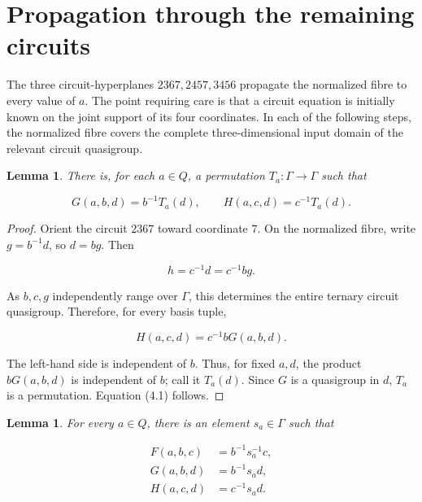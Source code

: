 \documentclass[11pt]{article}
\newtheorem{lemma}[theorem]{Lemma}
\numberwithin{equation}{section}
\begin{document}
\section{Propagation through the remaining circuits}


The three circuit-hyperplanes $2367,2457,3456$ propagate the normalized
fibre to every value of $a$. The point requiring care is that a circuit
equation is initially known on the joint support of its four coordinates.
In each of the following steps, the normalized fibre covers the complete
three-dimensional input domain of the relevant circuit quasigroup.

\Needspace{0.26\textheight}
\begin{lemma}
There is, for each $a\in Q$, a permutation
$T_a:\Gamma\to\Gamma$ such that

\nopagebreak[4]
\[
G(a,b,d)=b^{-1}T_a(d),\qquad
H(a,c,d)=c^{-1}T_a(d).               \tag{4.1}
\]

\end{lemma}

\begin{proof}
Orient the circuit $2367$ toward coordinate $7$. On the
normalized fibre, write $g=b^{-1}d$, so $d=bg$. Then

\nopagebreak[4]
\[
h=c^{-1}d=c^{-1}bg.
\]

As $b,c,g$ independently range over $\Gamma$, this determines the entire
ternary circuit quasigroup. Therefore, for every basis tuple,

\nopagebreak[4]
\[
H(a,c,d)=c^{-1}bG(a,b,d).            \tag{4.2}
\]

The left-hand side is independent of $b$. Thus, for fixed $a,d$, the
product $bG(a,b,d)$ is independent of $b$; call it $T_a(d)$. Since
$G$ is a quasigroup in $d$, $T_a$ is a permutation. Equation (4.1)
follows.
\end{proof}


\Needspace{0.26\textheight}
\begin{lemma}
For every $a\in Q$, there is an element
$s_a\in\Gamma$ such that

\nopagebreak[4]
\[
\begin{aligned}
F(a,b,c)&=b^{-1}s_a^{-1}c,\\
G(a,b,d)&=b^{-1}s_a d,\\
H(a,c,d)&=c^{-1}s_a d.
\end{aligned}               \tag{4.3}
\]

\end{lemma}
\end{document}
